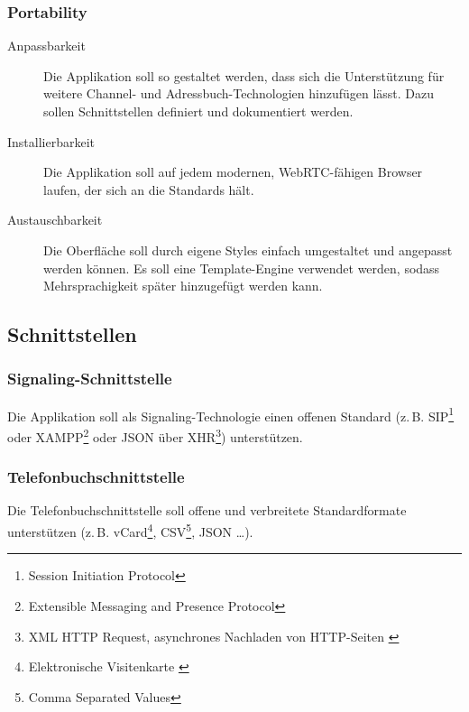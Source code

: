 		\subsubsection{Portability}
		\begin{description}
			\item[Anpassbarkeit] Die Applikation soll so gestaltet werden, dass sich die
			Unterstützung für weitere Channel- und Adressbuch-Technologien hinzufügen lässt. Dazu sollen Schnittstellen definiert und dokumentiert werden.
			\item[Installierbarkeit] Die Applikation soll auf jedem
			modernen, WebRTC-fähigen Browser laufen, der sich an die Standards
			hält.
			\item[Austauschbarkeit] Die Oberfläche soll durch eigene Styles einfach umgestaltet und angepasst werden können. Es soll eine Template-Engine verwendet werden, sodass Mehrsprachigkeit später hinzugefügt werden kann.
		\end{description}

	\subsection{Schnittstellen}

		\subsubsection{Signaling-Schnittstelle}
		Die Applikation soll als Signaling-Technologie einen offenen Standard (z.\,B.
		SIP\footnote{Session Initiation Protocol\cite{IETF-SDP-RFC}} oder XAMPP\footnote{Extensible Messaging and Presence Protocol\cite{IETF-XMPP-RFC}} oder JSON über 
		XHR\footnote{XML HTTP Request, asynchrones Nachladen von HTTP-Seiten
		\cite{MDN-XHR-Cross-Site}}) unterstützen.

		\subsubsection{Telefonbuchschnittstelle}
		Die Telefonbuchschnittstelle soll offene und verbreitete Standardformate
		unterstützen (z.\,B. vCard\footnote{Elektronische Visitenkarte
		\cite{IETF-vCard-RFC}}, CSV\footnote{Comma Separated
		Values\cite{IETF-CSV-RFC}}, JSON \ldots).
